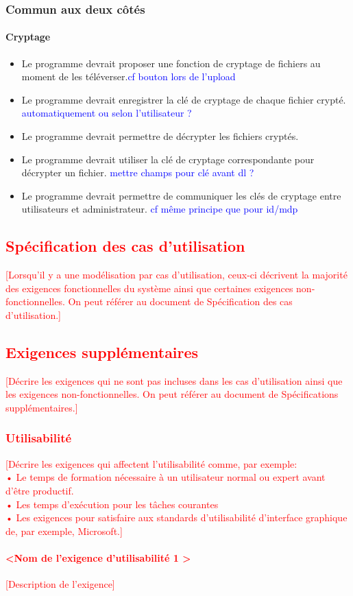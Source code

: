 \documentclass[10pt,a4paper]{report}
\begin{document}
\subsubsection{Commun aux deux côtés}
\paragraph{Cryptage}
	\begin{itemize}
		\item Le programme devrait proposer une fonction de cryptage de fichiers au moment de les téléverser.\textcolor{blue}{cf bouton lors de l'upload}
		\item Le programme devrait enregistrer la clé de cryptage de chaque fichier crypté. \textcolor{blue}{automatiquement ou selon l'utilisateur ?}
		\item Le programme devrait permettre de décrypter les fichiers cryptés.
		\item Le programme devrait utiliser la clé de cryptage correspondante pour décrypter un fichier. \textcolor{blue}{mettre champs pour clé avant dl ?}
		\item Le programme devrait permettre de communiquer les clés de cryptage entre utilisateurs et administrateur. \textcolor{blue}{cf même principe que pour id/mdp}
	\end{itemize}

\textcolor{red}{\subsection{Spécification des cas d’utilisation}
[Lorsqu’il y a une modélisation par cas d’utilisation, ceux-ci décrivent la majorité des exigences fonctionnelles du système ainsi que certaines exigences non-fonctionnelles. On peut référer au document de Spécification des cas d’utilisation.]}

\textcolor{red}{\subsection{Exigences supplémentaires}
[Décrire les exigences qui ne sont pas incluses dans les cas d’utilisation ainsi que les exigences non-fonctionnelles. On peut référer au document de Spécifications supplémentaires.]}

\textcolor{red}{\subsubsection{Utilisabilité}
[Décrire les exigences qui affectent l’utilisabilité comme, par exemple:\\
•	Le temps de formation nécessaire à un utilisateur normal ou expert avant d’être productif.\\
•	Les temps d’exécution pour les tâches courantes\\
•	Les exigences pour satisfaire aux standards d’utilisabilité d’interface graphique de, par exemple, Microsoft.]
\paragraph{\textless Nom de l’exigence d’utilisabilité 1 \textgreater}
[Description de l’exigence]}
\end{document}
